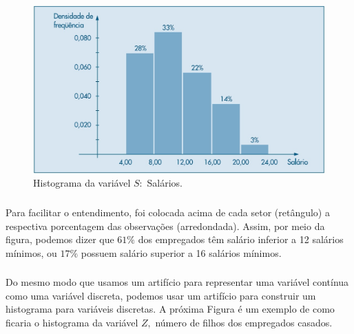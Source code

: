 \documentclass[14pt,aspectratio=1610]{beamer}
\begin{document}
\begin{frame}{}
\frametitle{}
\begin{block}{}
\justifying
\begin{figure}[H]
    \centering
    \includegraphics[scale=0.5]{Fig5}
    \caption{Histograma da variável $S:$ Salários.}
    \label{Fig5_ex}
  \end{figure}
\end{block}
\end{frame}

\begin{frame}{}
\frametitle{}
\begin{block}{}
\justifying
Para facilitar o entendimento, foi colocada acima de cada setor (retângulo) a respectiva
porcentagem das observações (arredondada). Assim, por meio da figura, podemos
dizer que $61\%$ dos empregados têm salário inferior a 12 salários mínimos, ou
$17\%$ possuem salário superior a 16 salários mínimos.
\end{block}
\end{frame}

\begin{frame}{}
\frametitle{}
\begin{block}{}
\justifying
Do mesmo modo que usamos um artifício para representar uma variável contínua
como uma variável discreta, podemos usar um artifício para construir um histograma
para variáveis discretas. A próxima Figura é um exemplo de como ficaria o histograma da
variável $Z,$ número de filhos dos empregados casados.
\end{block}
\end{frame}
\end{document}
